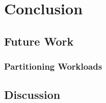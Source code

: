\chapter{Conclusion}
\section{Future Work}
\subsection{Partitioning Workloads}
\section{Discussion}

